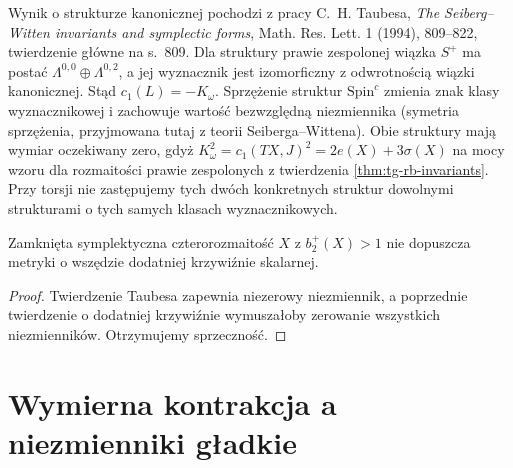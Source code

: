 Wynik o strukturze kanonicznej pochodzi z pracy
C.~H. Taubesa, \emph{The Seiberg--Witten invariants
and symplectic forms}, Math. Res. Lett. 1
(1994), 809--822, twierdzenie główne na s.~809.
Dla struktury prawie zespolonej wiązka
$S^+$ ma postać $\Lambda^{0,0}\oplus\Lambda^{0,2}$,
a jej wyznacznik jest izomorficzny z odwrotnością
wiązki kanonicznej. Stąd $c_1(L)=-K_\omega$.
Sprzężenie struktur $\mathrm{Spin}^c$ zmienia
znak klasy wyznacznikowej i zachowuje wartość
bezwzględną niezmiennika (symetria sprzężenia,
przyjmowana tutaj z teorii Seiberga--Wittena).
Obie struktury mają wymiar oczekiwany zero,
gdyż $K_\omega^2=c_1(TX,J)^2=2e(X)+3\sigma(X)$
na mocy wzoru dla rozmaitości prawie zespolonych
z twierdzenia \ref{thm:tg-rb-invariants}.
Przy torsji nie zastępujemy tych dwóch konkretnych
struktur dowolnymi strukturami o tych samych
klasach wyznacznikowych.

\begin{wniosek}
Zamknięta symplektyczna czterorozmaitość
$X$ z $b_2^+(X)>1$ nie dopuszcza metryki o wszędzie
dodatniej krzywiźnie skalarnej.
\end{wniosek}

\begin{proof}
Twierdzenie Taubesa zapewnia niezerowy niezmiennik,
a poprzednie twierdzenie o dodatniej krzywiźnie
wymuszałoby zerowanie wszystkich niezmienników.
Otrzymujemy sprzeczność.
\end{proof}

\section{Wymierna kontrakcja a niezmienniki gładkie}
\label{sec:tg-sw-rb}

